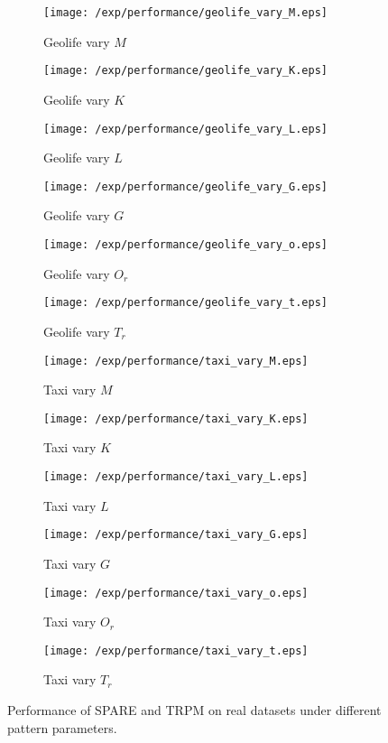 \begin{figure*}[t]
	\begin{subfigure}[b]{0.16\textwidth}
        \texttt{[image: /exp/performance/geolife\_vary\_M.eps]}
        \caption{Geolife vary $M$}
    \end{subfigure}
    \begin{subfigure}[b]{0.16\textwidth}
        \texttt{[image: /exp/performance/geolife\_vary\_K.eps]}
        \caption{Geolife vary $K$}
    \end{subfigure}
    \begin{subfigure}[b]{0.16\textwidth}
        \texttt{[image: /exp/performance/geolife\_vary\_L.eps]}
        \caption{Geolife vary $L$}
    \end{subfigure}
       \begin{subfigure}[b]{0.16\textwidth}
        \texttt{[image: /exp/performance/geolife\_vary\_G.eps]}
        \caption{Geolife vary $G$}
    \end{subfigure}       
 	 \begin{subfigure}[b]{0.16\textwidth}
        \texttt{[image: /exp/performance/geolife\_vary\_o.eps]}
        \caption{Geolife vary $O_r$}
    \end{subfigure}
 	\begin{subfigure}[b]{0.16\textwidth}
        \texttt{[image: /exp/performance/geolife\_vary\_t.eps]}
        \caption{Geolife vary $T_r$}
    \end{subfigure}    
    
    \begin{subfigure}[b]{0.16\textwidth}
        \texttt{[image: /exp/performance/taxi\_vary\_M.eps]}
        \caption{Taxi vary $M$}
    \end{subfigure}
    \begin{subfigure}[b]{0.16\textwidth}
        \texttt{[image: /exp/performance/taxi\_vary\_K.eps]}
        \caption{Taxi vary $K$}
    \end{subfigure}
    \begin{subfigure}[b]{0.16\textwidth}
        \texttt{[image: /exp/performance/taxi\_vary\_L.eps]}
        \caption{Taxi vary $L$}
    \end{subfigure}
       \begin{subfigure}[b]{0.16\textwidth}
        \texttt{[image: /exp/performance/taxi\_vary\_G.eps]}
        \caption{Taxi vary $G$}
    \end{subfigure}   
	 \begin{subfigure}[b]{0.16\textwidth}
        \texttt{[image: /exp/performance/taxi\_vary\_o.eps]}
        \caption{Taxi vary $O_r$}
    \end{subfigure}
    	 \begin{subfigure}[b]{0.16\textwidth}
        \texttt{[image: /exp/performance/taxi\_vary\_t.eps]}
        \caption{Taxi vary $T_r$}
    \end{subfigure}      
        
\caption{Performance of SPARE and TRPM on real datasets under different pattern parameters.}
\label{exp:performance_vary}
\end{figure*}
